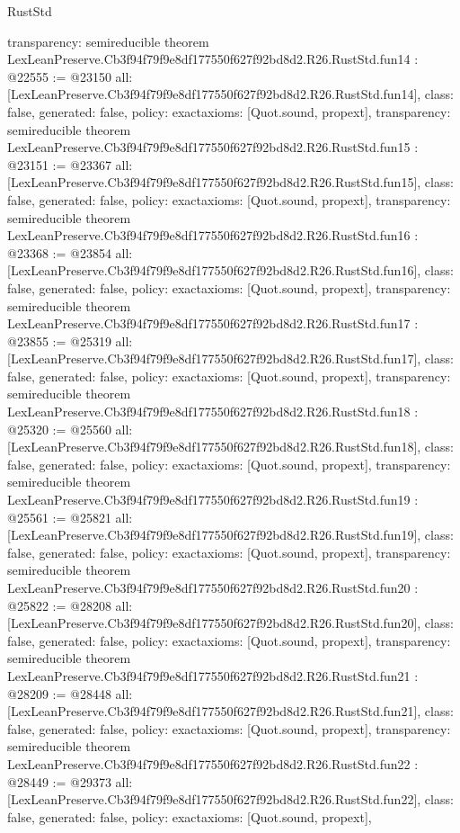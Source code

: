 \begin{lexlean}{RustStd}
\begin{coremodule}
{  transparency: semireducible
}
theorem LexLeanPreserve.Cb3f94f79f9e8df177550f627f92bd8d2.R26.RustStd.fun14 : @22555 := @23150 {
  all: [LexLeanPreserve.Cb3f94f79f9e8df177550f627f92bd8d2.R26.RustStd.fun14],
  class: false,
  generated: false,
  policy: exact{axioms: [Quot.sound, propext]},
  transparency: semireducible
}
theorem LexLeanPreserve.Cb3f94f79f9e8df177550f627f92bd8d2.R26.RustStd.fun15 : @23151 := @23367 {
  all: [LexLeanPreserve.Cb3f94f79f9e8df177550f627f92bd8d2.R26.RustStd.fun15],
  class: false,
  generated: false,
  policy: exact{axioms: [Quot.sound, propext]},
  transparency: semireducible
}
theorem LexLeanPreserve.Cb3f94f79f9e8df177550f627f92bd8d2.R26.RustStd.fun16 : @23368 := @23854 {
  all: [LexLeanPreserve.Cb3f94f79f9e8df177550f627f92bd8d2.R26.RustStd.fun16],
  class: false,
  generated: false,
  policy: exact{axioms: [Quot.sound, propext]},
  transparency: semireducible
}
theorem LexLeanPreserve.Cb3f94f79f9e8df177550f627f92bd8d2.R26.RustStd.fun17 : @23855 := @25319 {
  all: [LexLeanPreserve.Cb3f94f79f9e8df177550f627f92bd8d2.R26.RustStd.fun17],
  class: false,
  generated: false,
  policy: exact{axioms: [Quot.sound, propext]},
  transparency: semireducible
}
theorem LexLeanPreserve.Cb3f94f79f9e8df177550f627f92bd8d2.R26.RustStd.fun18 : @25320 := @25560 {
  all: [LexLeanPreserve.Cb3f94f79f9e8df177550f627f92bd8d2.R26.RustStd.fun18],
  class: false,
  generated: false,
  policy: exact{axioms: [Quot.sound, propext]},
  transparency: semireducible
}
theorem LexLeanPreserve.Cb3f94f79f9e8df177550f627f92bd8d2.R26.RustStd.fun19 : @25561 := @25821 {
  all: [LexLeanPreserve.Cb3f94f79f9e8df177550f627f92bd8d2.R26.RustStd.fun19],
  class: false,
  generated: false,
  policy: exact{axioms: [Quot.sound, propext]},
  transparency: semireducible
}
theorem LexLeanPreserve.Cb3f94f79f9e8df177550f627f92bd8d2.R26.RustStd.fun20 : @25822 := @28208 {
  all: [LexLeanPreserve.Cb3f94f79f9e8df177550f627f92bd8d2.R26.RustStd.fun20],
  class: false,
  generated: false,
  policy: exact{axioms: [Quot.sound, propext]},
  transparency: semireducible
}
theorem LexLeanPreserve.Cb3f94f79f9e8df177550f627f92bd8d2.R26.RustStd.fun21 : @28209 := @28448 {
  all: [LexLeanPreserve.Cb3f94f79f9e8df177550f627f92bd8d2.R26.RustStd.fun21],
  class: false,
  generated: false,
  policy: exact{axioms: [Quot.sound, propext]},
  transparency: semireducible
}
theorem LexLeanPreserve.Cb3f94f79f9e8df177550f627f92bd8d2.R26.RustStd.fun22 : @28449 := @29373 {
  all: [LexLeanPreserve.Cb3f94f79f9e8df177550f627f92bd8d2.R26.RustStd.fun22],
  class: false,
  generated: false,
  policy: exact{axioms: [Quot.sound, propext]},
}
\end{coremodule}
\end{lexlean}
